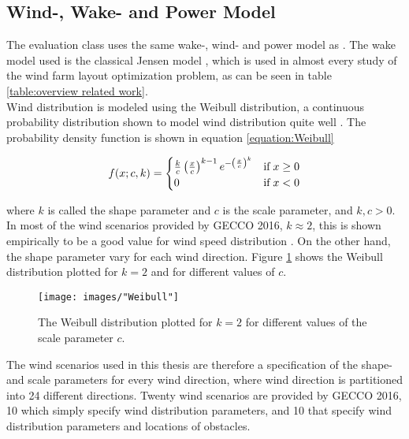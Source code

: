 \subsection{Wind-, Wake- and Power Model}\label{subsection:wind-, wake- and power model}
The evaluation class uses the same wake-, wind- and power model as \cite{Kusiak}. The wake model used is the classical Jensen model \citep{Jensen}, which is used in almost every study of the wind farm layout optimization problem, as can be seen in table \ref{table:overview related work}. \\

\noindent Wind distribution is modeled using the Weibull distribution, a continuous probability distribution shown to model wind distribution quite well \citep{Justus}. The probability density function is shown in equation \ref{equation:Weibull}


\begin{equation}
f(x; c, k)  = 
\begin{cases}
\frac{k}{c} \left( \frac{x}{c} \right)^{k-1} e^{- \left( \frac{x}{c} \right)^k } & \text{if} \hspace{1mm} x \geq 0 \\
0                                                                                                                      & \text{if} \hspace{1mm}     x < 0
\end{cases}
\label{equation:Weibull}
\end{equation}


\noindent where $k$ is called the shape parameter and $c$ is the scale parameter, and $k, c > 0$. In most of the wind scenarios provided by GECCO 2016, $k \approx 2$, this is shown empirically to be a good value for wind speed distribution \citep{Justus}. On the other hand, the shape parameter vary for each wind direction. Figure \ref{figure:weibull distribution} shows the Weibull distribution plotted for $k = 2$ and for different values of $c$. \\


\begin{figure}[h!]
\begin{center}
\texttt{[image: images/"Weibull"]}
\caption{The Weibull distribution plotted for $k = 2$ for different values of the scale parameter $c$.}
\label{figure:weibull distribution}
\end{center}
\end{figure}

\noindent The wind scenarios used in this thesis are therefore a specification of the shape- and scale parameters for every wind direction, where wind direction is partitioned into 24 different directions. Twenty wind scenarios are provided by GECCO 2016, 10 which simply specify wind distribution parameters, and 10 that specify wind distribution parameters and locations of obstacles. \\

